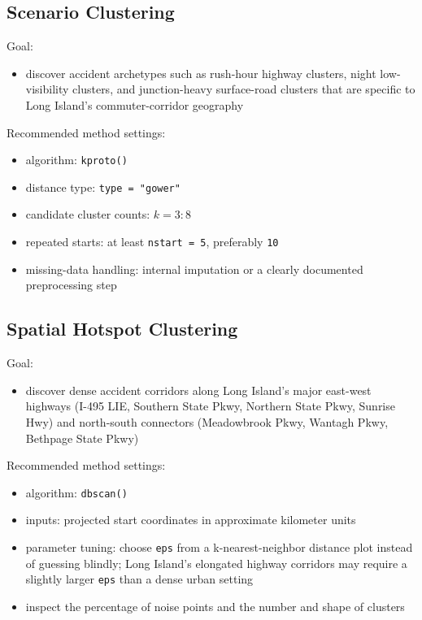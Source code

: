 \documentclass[11pt]{article}
\begin{document}
\subsection{Scenario Clustering}

Goal:

\begin{itemize}
\item discover accident archetypes such as rush-hour highway clusters, night low-visibility clusters, and junction-heavy surface-road clusters that are specific to Long Island's commuter-corridor geography
\end{itemize}

Recommended method settings:

\begin{itemize}
\item algorithm: \texttt{kproto()}
\item distance type: \texttt{type = "gower"}
\item candidate cluster counts: $k = 3:8$
\item repeated starts: at least \texttt{nstart = 5}, preferably \texttt{10}
\item missing-data handling: internal imputation or a clearly documented preprocessing step
\end{itemize}

\subsection{Spatial Hotspot Clustering}

Goal:

\begin{itemize}
\item discover dense accident corridors along Long Island's major east-west highways (I-495 LIE, Southern State Pkwy, Northern State Pkwy, Sunrise Hwy) and north-south connectors (Meadowbrook Pkwy, Wantagh Pkwy, Bethpage State Pkwy)
\end{itemize}

Recommended method settings:

\begin{itemize}
\item algorithm: \texttt{dbscan()}
\item inputs: projected start coordinates in approximate kilometer units
\item parameter tuning: choose \texttt{eps} from a k-nearest-neighbor distance plot instead of guessing blindly; Long Island's elongated highway corridors may require a slightly larger \texttt{eps} than a dense urban setting
\item inspect the percentage of noise points and the number and shape of clusters
\end{itemize}
\end{document}
